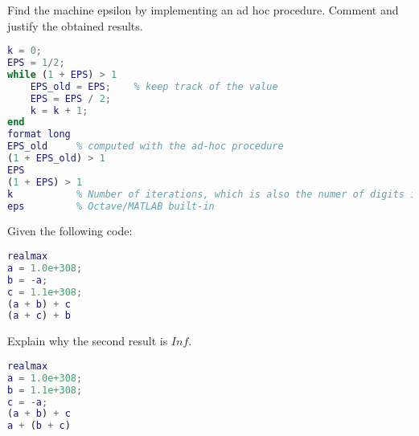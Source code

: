 \documentclass[12pt, a4paper]{report}
\newtheorem[style=M,bodystyle=\normalfont]{theorem}{Theorem}
\newtheorem[style=M,bodystyle=\normalfont]{corollary}{Corollary}
\newtheorem[style=M,bodystyle=\normalfont]{lemma}{Lemma}
\newtheorem[style=M,bodystyle=\normalfont]{definition}{Definition}
\begin{document}
    \newpage

    \begin{Exercise}[label=5]
        Find the machine epsilon by implementing an ad hoc procedure. Comment and justify the obtained results.
    \end{Exercise}
    \begin{Answer}[ref=5]
        \begin{lstlisting}[language=Matlab]
% Pay attention, you cannot use "eps" since it is a built-in variable
k = 0;
EPS = 1/2;
while (1 + EPS) > 1
    EPS_old = EPS;    % keep track of the value
    EPS = EPS / 2;
    k = k + 1;
end
format long
EPS_old		% computed with the ad-hoc procedure
(1 + EPS_old) > 1
EPS
(1 + EPS) > 1
k			% Number of iterations, which is also the numer of digits in the mantissa, according to the standard
eps			% Octave/MATLAB built-in        
        \end{lstlisting}
    \end{Answer}

    \newpage

    \begin{Exercise}[label=6]
        Given the following code:
        \begin{lstlisting}[language=Matlab]
realmax
a = 1.0e+308;
b = -a;
c = 1.1e+308;
(a + b) + c
(a + c) + b  
        \end{lstlisting}
        Explain why the second result is $Inf$.
    \end{Exercise}
    \begin{Answer}[ref=6]
        \begin{lstlisting}[language=Matlab]
realmax
a = 1.0e+308;
b = 1.1e+308;
c = -a;
(a + b) + c
a + (b + c)
        \end{lstlisting}    
    \end{Answer}

    \newpage
\end{document}
